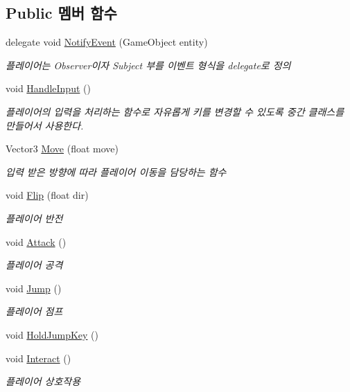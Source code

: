 \subsection*{Public 멤버 함수}
\begin{DoxyCompactItemize}
\item 
delegate void \mbox{\hyperlink{class_player_controller_a934c7f80b80276620cd60eaaeea7520e}{Notify\+Event}} (Game\+Object entity)
\begin{DoxyCompactList}\small\item\em 플레이어는 Observer이자 Subject 부를 이벤트 형식을 delegate로 정의 \end{DoxyCompactList}\item 
void \mbox{\hyperlink{class_player_controller_a5ebfe098b2dc258ca8349e6951766883}{Handle\+Input}} ()
\begin{DoxyCompactList}\small\item\em 플레이어의 입력을 처리하는 함수로 자유롭게 키를 변경할 수 있도록 중간 클래스를 만들어서 사용한다. \end{DoxyCompactList}\item 
Vector3 \mbox{\hyperlink{class_player_controller_a50157884365897164379b8bad7ee4722}{Move}} (float move)
\begin{DoxyCompactList}\small\item\em 입력 받은 방향에 따라 플레이어 이동을 담당하는 함수 \end{DoxyCompactList}\item 
void \mbox{\hyperlink{class_player_controller_a4cc61bc6a9187892458138a1d0ffc207}{Flip}} (float dir)
\begin{DoxyCompactList}\small\item\em 플레이어 반전 \end{DoxyCompactList}\item 
void \mbox{\hyperlink{class_player_controller_a473a610cfe2a374d5cb39b3c44881d11}{Attack}} ()
\begin{DoxyCompactList}\small\item\em 플레이어 공격 \end{DoxyCompactList}\item 
void \mbox{\hyperlink{class_player_controller_a8a7010cb6f3c524737be3f6f77553df9}{Jump}} ()
\begin{DoxyCompactList}\small\item\em 플레이어 점프 \end{DoxyCompactList}\item 
void \mbox{\hyperlink{class_player_controller_ad5c697ec9c26fbd98bdd028e06ca3ae2}{Hold\+Jump\+Key}} ()
\item 
void \mbox{\hyperlink{class_player_controller_a1f27776786e67be2633f94b97c93ebdc}{Interact}} ()
\begin{DoxyCompactList}\small\item\em 플레이어 상호작용 \end{DoxyCompactList}\end{DoxyCompactItemize}

